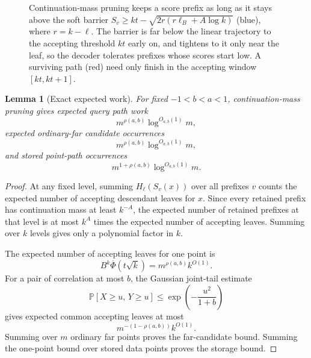 \documentclass[10pt]{article}
\newtheorem{lemma}[theorem]{Lemma}
\theoremstyle{definition}
\newcommand{\Prb}{\mathbb{P}}
\begin{document}
\begin{figure}[t]\centering
{}
\caption{Continuation-mass pruning keeps a score prefix as long as it stays above the soft barrier $S_v\ge kt-\sqrt{2r(r\ell_B+A\log k)}$ (blue), where $r=k-\ell$. The barrier is far below the linear trajectory to the accepting threshold $kt$ early on, and tightens to it only near the leaf, so the decoder tolerates prefixes whose scores start low. A surviving path (red) need only finish in the accepting window $[kt,kt+1]$.}
\label{fig:barrier}
\end{figure}

\begin{lemma}[Exact expected work]\label{lem:continuation-work}
   For fixed $-1<b<a<1$, continuation-mass pruning gives expected query path work
   \[
      m^{\rho(a,b)}\log^{O_{a,b}(1)}m,
   \]
   expected ordinary-far candidate occurrences
   \[
      m^{\rho(a,b)}\log^{O_{a,b}(1)}m,
   \]
   and stored point-path occurrences
   \[
      m^{1+\rho(a,b)}\log^{O_{a,b}(1)}m.
   \]
\end{lemma}

\begin{proof}
   At any fixed level, summing $H_\ell(S_v(x))$ over all prefixes $v$ counts the expected number of accepting descendant leaves for $x$. Since every retained prefix has continuation mass at least $k^{-A}$, the expected number of retained prefixes at that level is at most $k^A$ times the expected number of accepting leaves. Summing over $k$ levels gives only a polynomial factor in $k$.

   The expected number of accepting leaves for one point is
   \[
      B^k\overline\Phi(t\sqrt{k})
      =
      m^{\rho(a,b)}k^{O(1)}.
   \]
   For a pair of correlation at most $b$, the Gaussian joint-tail estimate
   \[
      \Prb[X\ge u,\,Y\ge u]
      \le
      \exp\!\left(-\frac{u^2}{1+b}\right)
   \]
   gives expected common accepting leaves at most
   \[
      m^{-(1-\rho(a,b))}k^{O(1)}.
   \]
   Summing over $m$ ordinary far points proves the far-candidate bound. Summing the one-point bound over stored data points proves the storage bound.
\end{proof}
\end{document}
